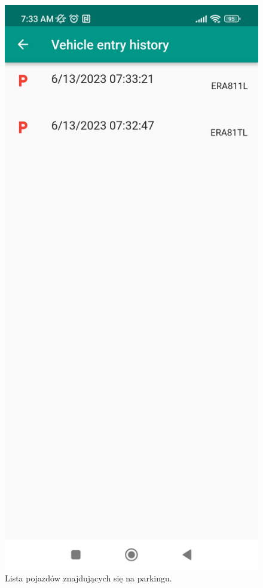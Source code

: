 \documentclass[a4paper, 11pt]{article}
\begin{document}
\begin{figure}
\begin{center}
\includegraphics[width=0.6\linewidth]{postoj.jpg}
\caption{Lista pojazdów znajdujących się na parkingu.}
\end{center}
\end{figure}
\end{document}
